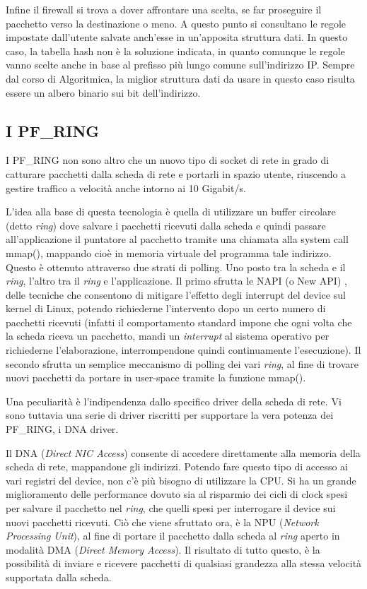 Infine il firewall si trova a dover affrontare una scelta, se far proseguire il pacchetto verso la destinazione o meno. A questo punto si consultano le regole impostate dall'utente salvate anch'esse in un'apposita struttura dati. In questo caso, la tabella hash non è la soluzione indicata, in quanto comunque le regole vanno scelte anche in base al prefisso più lungo comune sull'indirizzo IP. Sempre dal corso di Algoritmica, la miglior struttura dati da usare in questo caso risulta essere un albero binario sui bit dell'indirizzo.

\subsection{I PF\_RING}

I PF\_RING \cite{pfring} non sono altro che un nuovo tipo di socket di rete in grado di catturare pacchetti dalla scheda di rete e portarli in spazio utente, riuscendo a gestire traffico a velocità anche intorno ai 10 Gigabit/s.

L'idea alla base di questa tecnologia è quella di utilizzare un buffer circolare (detto \emph{ring}) dove salvare i pacchetti ricevuti dalla scheda e quindi passare all'applicazione il puntatore al pacchetto tramite una chiamata alla system call mmap(), mappando cioè in memoria virtuale del programma tale indirizzo. Questo è ottenuto attraverso due strati di polling. Uno posto tra la scheda e il \emph{ring}, l'altro tra il \emph{ring} e l'applicazione. Il primo sfrutta le NAPI (o New API) \cite{napi}, delle tecniche che consentono di mitigare l'effetto degli interrupt del device sul kernel di Linux, potendo richiederne l'intervento dopo un certo numero di pacchetti ricevuti (infatti il comportamento standard impone che ogni volta che la scheda riceva un pacchetto, mandi un \emph{interrupt} al sistema operativo per richiederne l'elaborazione, interrompendone quindi continuamente l'esecuzione). Il secondo sfrutta un semplice meccanismo di polling dei vari \emph{ring}, al fine di trovare nuovi pacchetti da portare in user-space tramite la funzione mmap().

Una peculiarità è l'indipendenza dallo specifico driver della scheda di rete. Vi sono tuttavia una serie di driver riscritti per supportare la vera potenza dei PF\_RING, i DNA driver.

Il DNA (\emph{Direct NIC Access}) \cite{pfringdna} consente di accedere direttamente alla memoria della scheda di rete, mappandone gli indirizzi. Potendo fare questo tipo di accesso ai vari registri del device, non c'è più bisogno di utilizzare la CPU. Si ha un grande miglioramento delle performance dovuto sia al risparmio dei cicli di clock spesi per salvare il pacchetto nel \emph{ring}, che quelli spesi per interrogare il device sui nuovi pacchetti ricevuti. Ciò che viene sfruttato ora, è la NPU (\emph{Network Processing Unit}), al fine di portare il pacchetto dalla scheda al \emph{ring} aperto in modalità DMA (\emph{Direct Memory Access}). Il risultato di tutto questo, è la possibilità di inviare e ricevere pacchetti di qualsiasi grandezza alla stessa velocità supportata dalla scheda.

